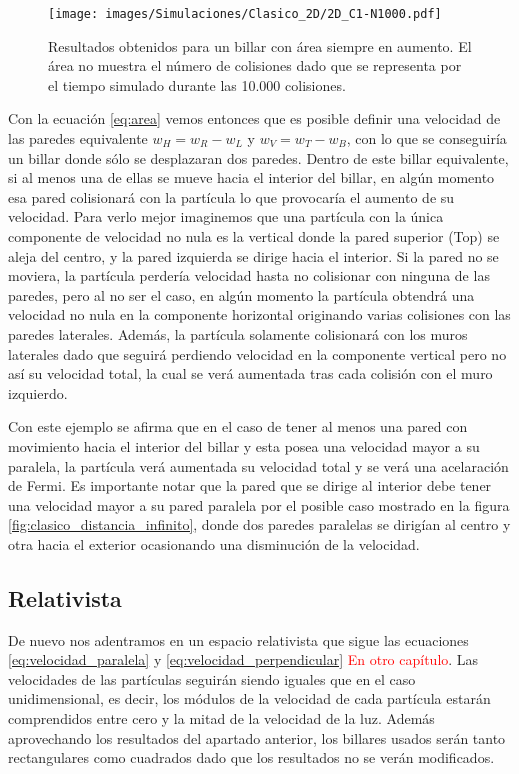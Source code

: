 \documentclass[11pt, spanish]{book}
\begin{document}
\begin{figure}[H]
    \centering
    \texttt{[image: images/Simulaciones/Clasico\_2D/2D\_C1-N1000.pdf]}
    \caption{Resultados obtenidos para un billar con área siempre en aumento. El área no muestra el número de colisiones dado que se representa por el tiempo simulado durante las 10.000 colisiones.}
    \label{fig:2D_C-N1000}
\end{figure}

Con la ecuación \ref{eq:area} vemos entonces que es posible definir una velocidad de las paredes equivalente \( w_H =  w_R - w_L \) y \( w_V = w_T - w_B \), con lo que se conseguiría un billar donde sólo se desplazaran dos paredes. Dentro de este billar equivalente, si al menos una de ellas se mueve hacia el interior del billar, en algún momento esa pared colisionará con la partícula lo que provocaría el aumento de su velocidad. Para verlo mejor imaginemos que una partícula con la única componente de velocidad no nula es la vertical donde la pared superior (Top) se aleja del centro, y la pared izquierda se dirige hacia el interior. Si la pared no se moviera, la partícula perdería velocidad hasta no colisionar con ninguna de las paredes, pero al no ser el caso, en algún momento la partícula obtendrá una velocidad no nula en la componente horizontal originando varias colisiones con las paredes laterales. Además, la partícula solamente colisionará con los muros laterales dado que seguirá perdiendo velocidad en la componente vertical pero no así su velocidad total, la cual se verá aumentada tras cada colisión con el muro izquierdo.

\vspace{3mm}

Con este ejemplo se afirma que en el caso de tener al menos una pared con movimiento hacia el interior del billar y esta posea una velocidad mayor a su paralela, la partícula verá aumentada su velocidad total y se verá una acelaración de Fermi. Es importante notar que la pared que se dirige al interior debe tener una velocidad mayor a su pared paralela por el posible caso mostrado en la figura \ref{fig:clasico_distancia_infinito}, donde dos paredes paralelas se dirigían al centro y otra hacia el exterior ocasionando una disminución de la velocidad.

\subsection{Relativista}

De nuevo nos adentramos en un espacio relativista que sigue las ecuaciones \ref{eq:velocidad_paralela} y \ref{eq:velocidad_perpendicular} \textcolor{red}{En otro capítulo}. Las velocidades de las partículas seguirán siendo iguales que en el caso unidimensional, es decir, los módulos de la velocidad de cada partícula estarán comprendidos entre cero y la mitad de la velocidad de la luz. Además aprovechando los resultados del apartado anterior, los billares usados serán tanto rectangulares como cuadrados dado que los resultados no se verán modificados.
\end{document}
